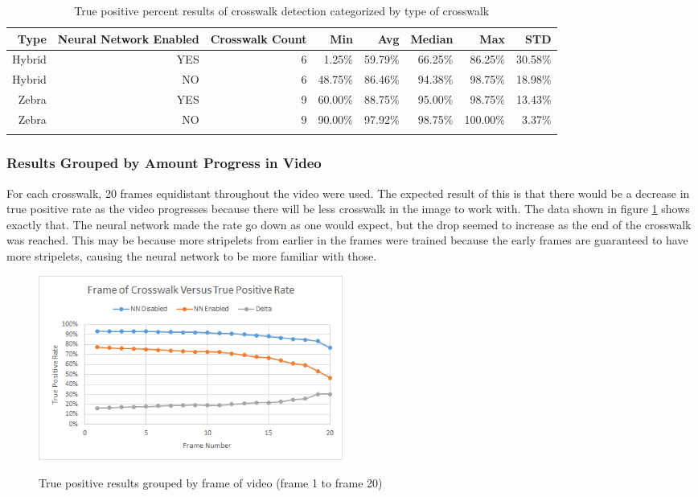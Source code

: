 \documentclass[12pt]{ucthesis}
\newcommand{\captionfonts}{\small\bf\ssp}
\begin{document}
\begin{center}
    \begin{longtable}[H]{|r|r|r|r|r|r|r|r|}
    \hline
    Type & \multicolumn{1}{l|}{Neural Network Enabled} & Crosswalk Count & Min & Avg & Median & Max & STD \bigstrut\\
    \hline
    Hybrid & YES & 6  & 1.25\% & 59.79\% & 66.25\% & 86.25\% & 30.58\% \bigstrut\\
    \hline
    Hybrid & NO & 6  & 48.75\% & 86.46\% & 94.38\% & 98.75\% & 18.98\% \bigstrut\\
    \hline
    Zebra & YES & 9  & 60.00\% & 88.75\% & 95.00\% & 98.75\% & 13.43\% \bigstrut\\
    \hline
    Zebra & NO & 9  & 90.00\% & 97.92\% & 98.75\% & 100.00\% & 3.37\% \bigstrut\\
    \hline



    \caption{True positive percent results of crosswalk detection categorized by type of crosswalk}
    \label{tab:typeOfCwalk} 
    \end{longtable}
\end{center}

\subsubsection{Results Grouped by Amount Progress in Video}

For each crosswalk, 20 frames equidistant throughout the video were used. The expected result of this is that there would be a decrease in true positive rate as the video progresses because there will be less crosswalk in the image to work with. The data shown in figure \ref{fig:graphOfFrameCount} shows exactly that. The neural network made the rate go down as one would expect, but the drop seemed to increase as the end of the crosswalk was reached. This may be because more stripelets from earlier in the frames were trained because the early frames are guaranteed to have more stripelets, causing the neural network to be more familiar with those. 

\begin{figure}[H]
\begin{center}
\includegraphics[width=10cm]{FrameResultsGraph.png}
\captionfonts
\caption[True Positives Grouped by Frame of Video]{True positive results grouped by frame of video (frame 1 to frame 20)}
\label{fig:graphOfFrameCount}
\end{center}
\end{figure}
\end{document}
